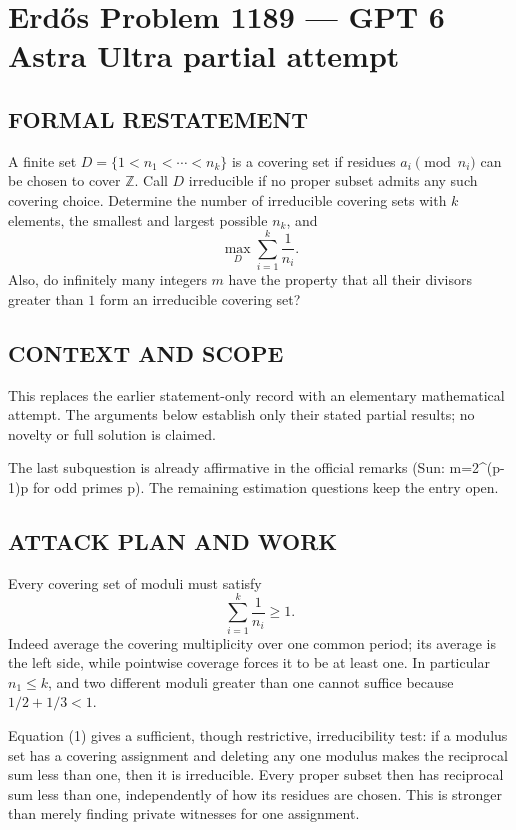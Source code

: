 \section*{Erd\H{o}s Problem 1189 --- GPT 6 Astra Ultra partial attempt}


\subsection*{FORMAL RESTATEMENT}
A finite set $D=\{1<n_1<\cdots<n_k\}$ is a covering set if residues $a_i\pmod{n_i}$ can be chosen to cover $\mathbb Z$. Call $D$ irreducible if no proper subset admits any such covering choice. Determine the number of irreducible covering sets with $k$ elements, the smallest and largest possible $n_k$, and
\[\max_D\sum_{i=1}^k\frac1{n_i}.\]
Also, do infinitely many integers $m$ have the property that all their divisors greater than $1$ form an irreducible covering set?

\subsection*{CONTEXT AND SCOPE}
This replaces the earlier statement-only record with an elementary mathematical attempt. The arguments below establish only their stated partial results; no novelty or full solution is claimed.

The last subquestion is already affirmative in the official remarks (Sun: m=2^(p-1)p for odd primes p). The remaining estimation questions keep the entry open.

\subsection*{ATTACK PLAN AND WORK}
Every covering set of moduli must satisfy
\[\sum_{i=1}^k\frac1{n_i}\ge1.\tag{1}\]
Indeed average the covering multiplicity over one common period; its average
is the left side, while pointwise coverage forces it to be at least one.
In particular $n_1\le k$, and two different moduli greater than one cannot
suffice because $1/2+1/3<1$.

Equation (1) gives a sufficient, though restrictive, irreducibility test:
if a modulus set has a covering assignment and deleting any one modulus makes
the reciprocal sum less than one, then it is irreducible. Every proper subset
then has reciprocal sum less than one, independently of how its residues are chosen.
This is stronger than merely finding private witnesses for one assignment.

